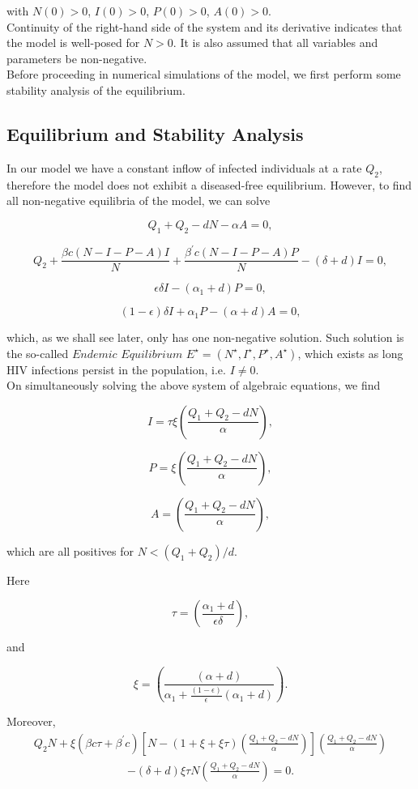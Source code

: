 with $N(0)>0$, $I(0)>0$, $P(0)>0$, $A(0)>0$.\\
Continuity of the right-hand side of the system and its derivative indicates that the model is well-posed for $N>0$. It is also assumed that all variables and parameters be non-negative.\\
Before proceeding in numerical simulations of the model, we first perform some stability analysis of the equilibrium.

\subsection{Equilibrium and Stability Analysis}
In our model we have a constant inflow of infected individuals at a rate $Q_{2}$, therefore the model does not exhibit a diseased-free equilibrium. However, to find all non-negative equilibria of the model, we can solve

$$
Q_{1} + Q_{2} -dN - \alpha A = 0,
$$

$$
Q_{2} + \frac{\beta c(N-I-P-A)I}{N} + \frac{\beta^{\prime} c(N-I-P-A)P}{N} - (\delta + d)I = 0,
$$

$$
\epsilon\delta I - (\alpha_{1} + d)P = 0,
$$

$$
(1 - \epsilon)\delta I + \alpha_{1}P - (\alpha + d)A = 0,
$$

which, as we shall see later, only has one non-negative solution. Such solution is the so-called $\textit{Endemic Equilibrium}$  $E^{\star} = (N^{\star},I^{\star},P^{\star},A^{\star})$, which exists as long HIV infections persist in the population, i.e. $I \neq 0$.\\

On simultaneously solving the above system of algebraic equations, we find

$$
I = \tau \xi \left(\frac{Q_{1} + Q_{2} - d N}{\alpha}\right),
$$

$$
P = \xi \left(\frac{Q_{1} + Q_{2} - d N}{\alpha}\right),
$$

$$
A = \left(\frac{Q_{1} + Q_{2} - dN}{\alpha}\right),
$$

which are all positives for $N<(Q_{1}+Q_{2})/d$.

Here

$$
\tau = \left(\frac{\alpha_{1} + d}{\epsilon \delta}\right),
$$

and

$$
\xi =  \left(\frac{(\alpha + d)}{\alpha_{1} + \frac{(1-\epsilon)}{\epsilon}(\alpha_{1}+d)}\right).
$$

Moreover,
\begin{align*}
Q_{2}N + \xi (\beta c\tau + \beta^{\prime}c) \left[N-(1+\xi+\xi\tau)\left(\frac{Q_{1}+Q_{2}-dN}{\alpha}\right)\right]\left(\frac{Q_{1}+Q_{2}-dN}{\alpha}\right)
\end{align*}
\begin{align*}
- (\delta+d) \xi\tau N \left(\frac{Q_{1}+Q_{2}-dN}{\alpha}\right) = 0.
\end{align*}

